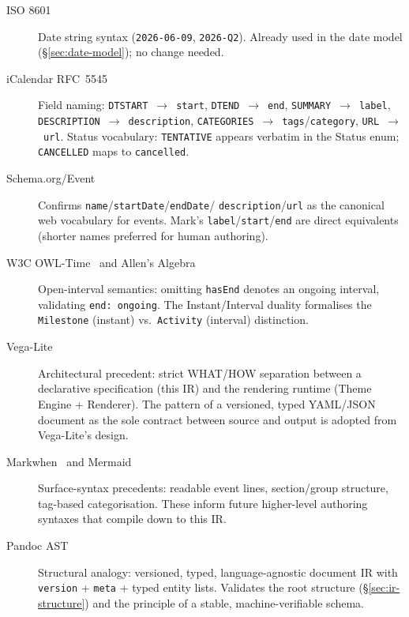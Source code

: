 \begin{description}
  \item[ISO 8601~\cite{iso8601}]
        Date string syntax (\texttt{2026-06-09}, \texttt{2026-Q2}).
        Already used in the date model (\S\ref{sec:date-model});
        no change needed.

  \item[iCalendar RFC~5545~\cite{ical-rfc5545}]
        Field naming: \texttt{DTSTART}~$\to$~\texttt{start},
        \texttt{DTEND}~$\to$~\texttt{end},
        \texttt{SUMMARY}~$\to$~\texttt{label},
        \texttt{DESCRIPTION}~$\to$~\texttt{description},
        \texttt{CATEGORIES}~$\to$~\texttt{tags}/\texttt{category},
        \texttt{URL}~$\to$~\texttt{url}.
        Status vocabulary: \texttt{TENTATIVE} appears verbatim in the Status
        enum; \texttt{CANCELLED} maps to \texttt{cancelled}.

  \item[Schema.org/Event~\cite{schemaorg-event}]
        Confirms \texttt{name}/\texttt{startDate}/\texttt{endDate}/
        \texttt{description}/\texttt{url} as the canonical web vocabulary for
        events. Mark's \texttt{label}/\texttt{start}/\texttt{end} are direct
        equivalents (shorter names preferred for human authoring).

  \item[W3C OWL-Time~\cite{owltime} and Allen's Algebra~\cite{allen1983}]
        Open-interval semantics: omitting \texttt{hasEnd} denotes an ongoing
        interval, validating \texttt{end: ongoing}. The Instant/Interval
        duality formalises the \texttt{Milestone} (instant) vs.\
        \texttt{Activity} (interval) distinction.

  \item[Vega-Lite~\cite{vegalite2017}]
        Architectural precedent: strict WHAT/HOW separation between a
        declarative specification (this IR) and the rendering runtime
        (Theme Engine + Renderer). The pattern of a versioned, typed YAML/JSON
        document as the sole contract between source and output is adopted from
        Vega-Lite's design.

  \item[Markwhen~\cite{markwhen} and Mermaid~\cite{mermaiddocs2024}]
        Surface-syntax precedents: readable event lines, section/group
        structure, tag-based categorisation. These inform future higher-level
        authoring syntaxes that compile down to this IR.

  \item[Pandoc AST~\cite{pandoc}]
        Structural analogy: versioned, typed, language-agnostic document IR with
        \texttt{version} + \texttt{meta} + typed entity lists. Validates the
        root structure (\S\ref{sec:ir-structure}) and the principle of a
        stable, machine-verifiable schema.
\end{description}

